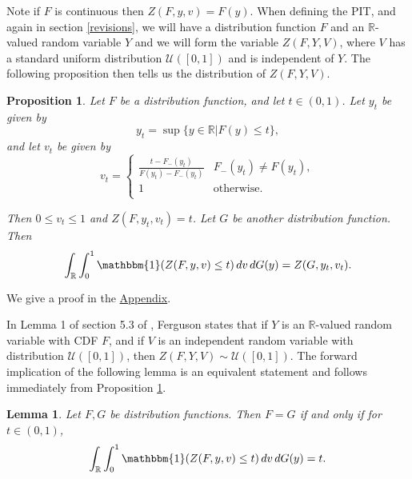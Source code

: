 \documentclass[aap]{imsart}
\theoremstyle{plain}
\newtheorem{proposition}[theorem]{Proposition}
\newtheorem{lemma}[theorem]{Lemma}
\theoremstyle{definition}
\begin{document}
Note if $F$ is continuous then $Z(F, y, v) = F(y)$. When defining the PIT, and again in section \ref{revisions}, we will have a distribution function $F$ and an $\mathbb{R}$-valued random variable $Y$ and we will form the variable $Z(F, Y, V)$, where $V$ has a standard uniform distribution $\mathcal{U}([0,1])$ and is independent of $Y$. The following proposition then tells us the distribution of $Z(F, Y, V)$.

\begin{proposition}\label{distribution_of_Z}
  Let $F$ be a distribution function, and let $t \in (0,1)$. Let $y_t$ be given by
\begin{equation*}
y_t = \sup \{y \in \mathbb{R}|F(y) \leq t\},
\end{equation*}
and let $v_t$ be given by
\begin{equation*}
v_t = \begin{cases}
  \frac{t - F_-(y_t)}{F(y_t) - F_-(y_t)} & F_-(y_t) \neq F(y_t), \\
  1 & \text{otherwise.} \\
\end{cases}
\end{equation*}

  Then $0 \leq v_t \leq 1$ and $Z(F, y_t, v_t) = t$. Let $G$ be another distribution function. Then
\begin{equation*}
  \int_\mathbb{R} \int_0^1 \mathbbm{1}(Z(F, y, v) \leq t) \,dv \,dG(y) = Z(G, y_t, v_t).
\end{equation*}
\end{proposition}

We give a proof in the \hyperref[appn]{Appendix}.

In Lemma 1 of section 5.3 of \cite{Fgs67}, Ferguson states that if $Y$ is an $\mathbb{R}$-valued random variable with CDF $F$, and if $V$ is an independent random variable with distribution $\mathcal{U}([0,1])$, then $Z(F, Y, V) \sim \mathcal{U}([0,1])$. The forward implication of the following lemma is an equivalent statement and follows immediately from Proposition \ref{distribution_of_Z}.

\begin{lemma}\label{PIT_is_uniform}
  Let $F, G$ be distribution functions. Then $F = G$ if and only if for $t \in (0,1)$,
\begin{equation*}
  \int_\mathbb{R} \int_0^1 \mathbbm{1}(Z(F,y,v) \leq t) \,dv \,dG(y) = t.
\end{equation*}
\end{lemma}
\end{document}
